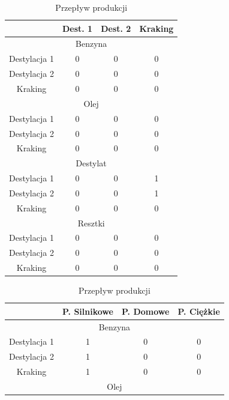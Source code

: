 \documentclass{article}
\begin{document}
\begin{table}[h!]
    \centering
    \begin{minipage}{0.45\textwidth}
        \centering
        \begin{tabular}{cccc}
            & Dest. 1 & Dest. 2 & Kraking \\
            \hline
            \hline
            \multicolumn{4}{c}{Benzyna} \\
            \hline
            Destylacja 1 & 0 & 0 & 0 \\
            Destylacja 2 & 0 & 0 & 0 \\
            Kraking & 0 & 0 & 0 \\
            \multicolumn{4}{c}{Olej} \\
            \hline
            Destylacja 1 & 0 & 0 & 0 \\
            Destylacja 2 & 0 & 0 & 0 \\
            Kraking & 0 & 0 & 0 \\
            \multicolumn{4}{c}{Destylat} \\
            \hline
            Destylacja 1 & 0 & 0 & 1 \\
            Destylacja 2 & 0 & 0 & 1 \\
            Kraking & 0 & 0 & 0 \\
            \multicolumn{4}{c}{Resztki} \\
            \hline
            Destylacja 1 & 0 & 0 & 0 \\
            Destylacja 2 & 0 & 0 & 0 \\
            Kraking & 0 & 0 & 0 \\
        \end{tabular}
        \caption{Przepływ produkcji}
        \label{tab:przeplyw_produkcji}
    \end{minipage}
    \hfill
    \begin{minipage}{0.45\textwidth}
        \centering
        \begin{tabular}{cccc}
            & P. Silnikowe & P. Domowe & P. Ciężkie \\
            \hline
            \hline
            \multicolumn{4}{c}{Benzyna} \\
            \hline
            Destylacja 1 & 1 & 0 & 0 \\
            Destylacja 2 & 1 & 0 & 0 \\
            Kraking & 1 & 0 & 0 \\
            \multicolumn{4}{c}{Olej} \\

\end{tabular}
\end{minipage}
\end{table}
\end{document}
